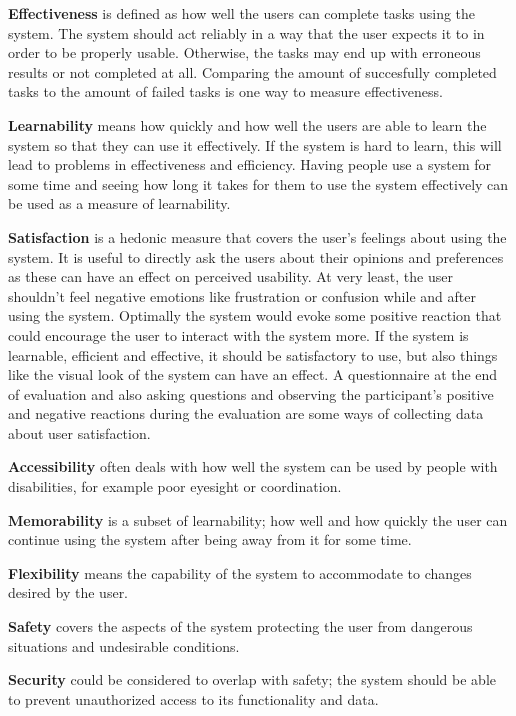 \textbf{Effectiveness} is defined as how well the users can complete tasks using the system. The system should act reliably in a way that the user expects it to in order to be properly usable. Otherwise, the tasks may end up with erroneous results or not completed at all. Comparing the amount of succesfully completed tasks to the amount of failed tasks is one way to measure effectiveness.

\textbf{Learnability} means how quickly and how well the users are able to learn the system so that they can use it effectively. If the system is hard to learn, this will lead to problems in effectiveness and efficiency. Having people use a system for some time and seeing how long it takes for them to use the system effectively can be used as a measure of learnability.

\textbf{Satisfaction} is a hedonic measure that covers the user's feelings about using the system. It is useful to directly ask the users about their opinions and preferences as these can have an effect on perceived usability. At very least, the user shouldn't feel negative emotions like frustration or confusion while and after using the system. Optimally the system would evoke some positive reaction that could encourage the user to interact with the system more. If the system is learnable, efficient and effective, it should be satisfactory to use, but also things like the visual look of the system can have an effect. A questionnaire at the end of evaluation and also asking questions and observing the participant's positive and negative reactions during the evaluation are some ways of collecting data about user satisfaction. \cite{abran2003usability, winter2008comprehensive}

\textbf{Accessibility} often deals with how well the system can be used by people with disabilities, for example poor eyesight or coordination.

\textbf{Memorability} is  a subset of learnability; how well and how quickly the user can continue using the system after being away from it for some time.

\textbf{Flexibility} means the capability of the system to accommodate to changes desired by the user.

\textbf{Safety} covers the aspects of the system protecting the user from dangerous situations and undesirable conditions. \cite{bevanevaluation, winter2008comprehensive}

\textbf{Security} could be considered to overlap with safety; the system should be able to prevent unauthorized access to its functionality and data. \cite{abran2003usability}

